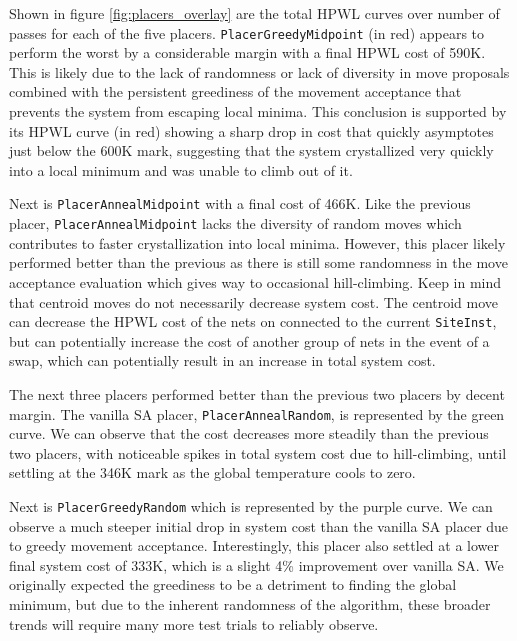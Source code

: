 Shown in figure \ref{fig:placers_overlay} are the total HPWL curves over number of passes for each of the five placers. 
\texttt{PlacerGreedyMidpoint} (in red) appears to perform the worst by a considerable margin with a final HPWL cost of 590K.
This is likely due to the lack of randomness or lack of diversity in move proposals combined with the persistent greediness of the movement acceptance that prevents the system from escaping local minima.
This conclusion is supported by its HPWL curve (in red) showing a sharp drop in cost that quickly asymptotes just below the 600K mark, suggesting that the system crystallized very quickly into a local minimum and was unable to climb out of it.

Next is \texttt{PlacerAnnealMidpoint} with a final cost of 466K.
Like the previous placer, \texttt{PlacerAnnealMidpoint} lacks the diversity of random moves which contributes to faster crystallization into local minima.
However, this placer likely performed better than the previous as there is still some randomness in the move acceptance evaluation which gives way to occasional hill-climbing. 
Keep in mind that centroid moves do not necessarily decrease system cost. 
The centroid move can decrease the HPWL cost of the nets on connected to the current \texttt{SiteInst}, but can potentially increase the cost of another group of nets in the event of a swap, which can potentially result in an increase in total system cost.

The next three placers performed better than the previous two placers by decent margin.
The vanilla SA placer, \texttt{PlacerAnnealRandom}, is represented by the green curve.
We can observe that the cost decreases more steadily than the previous two placers, with noticeable spikes in total system cost due to hill-climbing, until settling at the 346K mark as the global temperature cools to zero.

Next is \texttt{PlacerGreedyRandom} which is represented by the purple curve.
We can observe a much steeper initial drop in system cost than the vanilla SA placer due to greedy movement acceptance.
Interestingly, this placer also settled at a lower final system cost of 333K, which is a slight 4\% improvement over vanilla SA.
We originally expected the greediness to be a detriment to finding the global minimum, but due to the inherent randomness of the algorithm, these broader trends will require many more test trials to reliably observe.

